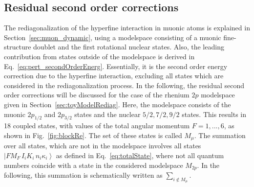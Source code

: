 \subsection{Residual second order corrections}
\label{sec:muon_residualSO}
The rediagonalization of the hyperfine interaction in muonic atoms is explained in Section~\ref{sec:muon_dynamic}, using a modelspace consisting of a muonic fine-structure doublet and the first rotational nuclear states. Also, the leading contribution from states outside of the modelspace is derived in Eq.~\eqref{eq:pert_secondOrderEnerg}. Essentially, it is the second order energy correction due to the hyperfine interaction, excluding all states which are considered in the rediagonalization process. In the following, the residual second order corrections will be discussed for the case of the rhenium $2p$ modelspace given in Section~\ref{sec:toyModelRediag}. Here, the modelspace consists of the muonic $2p_{1/2}$ and $2p_{3/2}$ states and the nuclear $5/2,7/2,9/2$ states. This results in 18 coupled states, with values of the total angular momentum $F=1,...,6$, as shown in Fig.~\ref{fig:blockRe}. The set of these states is called $M_{\mu}$. The summation over all states, which are not in the modelspace involves all states $\left|FM_F\,I_iK_i\,n_i\kappa_i\right>$ as defined in Eq.~\eqref{eq:totalState}, where not all quantum numbers coincide with a state in the considered modelspace $M_{2p}$. In the following, this summation is schematically written as $\sum_{i\notin M_{\mu}}$.

